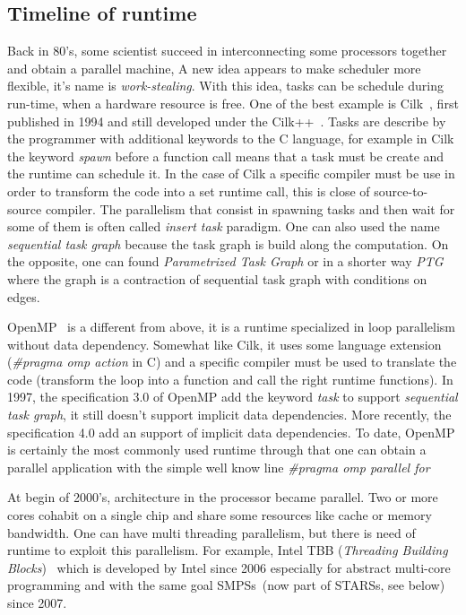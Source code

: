 \subsection{Timeline of runtime}
Back in 80's, some scientist succeed in interconnecting some processors together and obtain a parallel machine,
%
A new idea appears to make scheduler more flexible, it's name is {\em work-stealing}.
%
With this idea, tasks can be schedule during run-time, when a hardware resource is free.
%
One of the best example is Cilk~\cite{Cilk}, first published in 1994 and still developed under the Cilk++~\cite{Cilk++}.
%
Tasks are describe by the programmer with additional keywords to the C language, for example in Cilk the keyword {\em spawn} before a function call means that a task must be create and the runtime can schedule it.
%
In the case of Cilk a specific compiler must be use in order to transform the code into a set runtime call, this is close of source-to-source compiler.
%
The parallelism that consist in spawning tasks and then wait for some of them is often called {\em insert task} paradigm.
%
One can also used the name {\em sequential task graph} because the task graph is build along the computation.
%
On the opposite, one can found {\em Parametrized Task Graph} or in a shorter way {\em PTG} where the graph is a contraction of sequential task graph with conditions on edges.


OpenMP~\cite{OpenMP} is a different from above, it is a runtime specialized in loop parallelism without data dependency.
%
Somewhat like Cilk, it uses some language extension ({\em \#pragma omp action} in C) and a specific compiler must be used to translate the code (transform the loop into a function and call the right runtime functions).
%
In 1997, the specification 3.0 of OpenMP add the keyword {\em task} to support {\em sequential task graph}, it still doesn't support implicit data dependencies.
%
More recently, the specification 4.0 add an support of implicit data dependencies.
%
To date, OpenMP is certainly the most commonly used runtime through that one can obtain a parallel application with the simple well know line {\em \#pragma omp parallel for}


At begin of 2000's, architecture in the processor became parallel.
%
Two or more cores cohabit on a single chip and share some resources like cache or memory bandwidth.
%
One can have multi threading parallelism, but there is need of runtime to exploit this parallelism.
%
For example, Intel TBB (\textit{Threading Building Blocks})~\cite{Intel::TBB} which is developed by Intel since 2006 especially for abstract multi-core programming and with the same goal SMPSs~\cite{SMPSs}(now part of STARSs, see below) since 2007.

